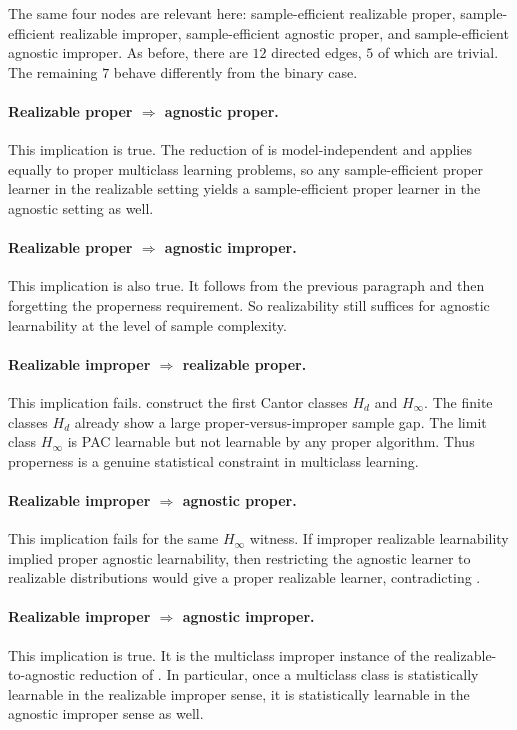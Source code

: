 The same four nodes are relevant here: sample-efficient realizable proper, sample-efficient realizable improper, sample-efficient agnostic proper, and sample-efficient agnostic improper. As before, there are $12$ directed edges, $5$ of which are trivial. The remaining $7$ behave differently from the binary case.

\paragraph{Realizable proper $\Rightarrow$ agnostic proper.}
This implication is true. The reduction of \citet{hopkins2024} is model-independent and applies equally to proper multiclass learning problems, so any sample-efficient proper learner in the realizable setting yields a sample-efficient proper learner in the agnostic setting as well.

\paragraph{Realizable proper $\Rightarrow$ agnostic improper.}
This implication is also true. It follows from the previous paragraph and then forgetting the properness requirement. So realizability still suffices for agnostic learnability at the level of sample complexity.

\paragraph{Realizable improper $\Rightarrow$ realizable proper.}
This implication fails. \citet[Theorem~1]{daniely2014optimal} construct the first Cantor classes $H_d$ and $H_\infty$. The finite classes $H_d$ already show a large proper-versus-improper sample gap. The limit class $H_\infty$ is PAC learnable but not learnable by any proper algorithm. Thus properness is a genuine statistical constraint in multiclass learning.

\paragraph{Realizable improper $\Rightarrow$ agnostic proper.}
This implication fails for the same $H_\infty$ witness. If improper realizable learnability implied proper agnostic learnability, then restricting the agnostic learner to realizable distributions would give a proper realizable learner, contradicting \citet[Theorem~1]{daniely2014optimal}.

\paragraph{Realizable improper $\Rightarrow$ agnostic improper.}
This implication is true. It is the multiclass improper instance of the realizable-to-agnostic reduction of \citet{hopkins2024}. In particular, once a multiclass class is statistically learnable in the realizable improper sense, it is statistically learnable in the agnostic improper sense as well.

